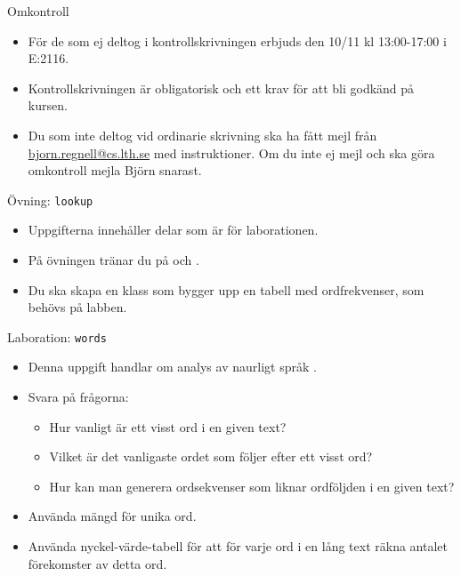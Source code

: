 

\ifkompendium\else
\begin{Slide}{Omkontroll}
\begin{itemize}
\item För de som ej deltog i kontrollskrivningen erbjuds  den 10/11 kl 13:00-17:00 i E:2116. 
\item Kontrollskrivningen är obligatorisk och ett krav för att bli godkänd på kursen.
\item Du som inte deltog vid ordinarie skrivning ska ha fått mejl från \url{bjorn.regnell@cs.lth.se} med instruktioner. Om du inte ej mejl och ska göra omkontroll mejla Björn snarast.
\end{itemize}  
\end{Slide}
\fi


\begin{Slide}{Övning: \texttt{lookup}}
\begin{itemize}
  \item Uppgifterna innehåller delar som är  för laborationen.
  \item På övningen tränar du på  och .
  \item Du ska skapa en klass  som bygger upp en tabell med ordfrekvenser, som behövs på labben.
\end{itemize}
\end{Slide}

\begin{Slide}{Laboration: \texttt{words}}
\begin{itemize}
  \item Denna uppgift handlar om analys av naurligt språk .
  \item Svara på frågorna:
  \begin{itemize}%
  \item Hur vanligt är ett visst ord i en given text?
  \item Vilket är det vanligaste ordet som följer efter ett visst ord?
  \item Hur kan man generera ordsekvenser som liknar ordföljden i en given text?
  \end{itemize}
\item Använda mängd för unika ord.
\item Använda nyckel-värde-tabell för att för varje ord i en lång text räkna antalet förekomster av detta ord.
\end{itemize}
\end{Slide}


